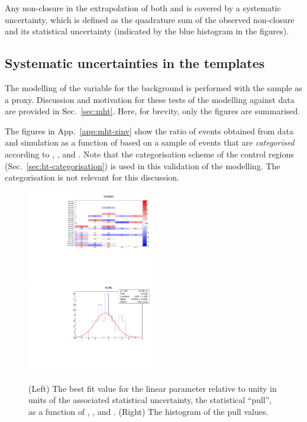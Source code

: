 Any non-closure in the extrapolation of both \alphat and \bdphi is
covered by a systematic uncertainty, which is defined as the
quadrature sum of the observed non-closure and its statistical
uncertainty (indicated by the blue histogram in the figures). 

\subsection{Systematic uncertainties in the \texorpdfstring{\HTmiss}{MHT} templates}
\label{sec:mht-zinv}

The modelling of the \mht variable for the \znunuj background is
performed with the \mmj sample as a proxy. Discussion and motivation
for these tests of the \mht modelling against data are provided in
Sec.~\ref{sec:mht}. Here, for brevity, only the figures are
summarised.

The figures in App.~\ref{app:mht-zinv} show the ratio of events
obtained from data and simulation as a function of \mht based on a
sample of \mmj events that are {\it categorised} according to \njet,
\scalht, and \nb. Note that the \scalht categorisation scheme of the
control regions (Sec.~\ref{sec:ht-categorisation}) is used in this
validation of the \mht modelling. The \nb categorisation is not
relevant for this discussion.

\begin{figure}[h!]
  \centering
  \includegraphics[width=0.5\textwidth]{figures/mhtTemplate/exclusive/MuMu_2D}~
  \includegraphics[width=0.5\textwidth]{figures/mhtTemplate/exclusive/MuMu}\\
  \caption{(Left) The best fit value for the linear parameter
    relative to unity in units of the associated statistical
    uncertainty, \ie the statistical ``pull'', as a function of \njet,
    \nb, and \scalht. (Right) The histogram of the pull values.}
  \label{fig:pulls-zinv} 
\end{figure}

